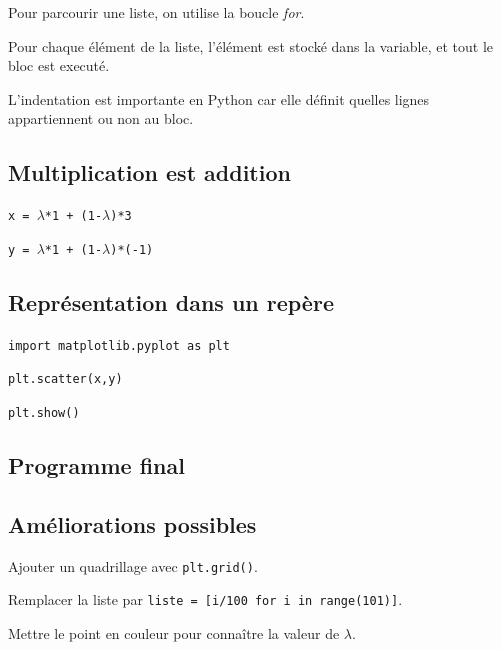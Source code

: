 Pour parcourir une liste, on utilise la boucle \emph{for}.

Pour chaque élément de la liste, l'élément est stocké dans la variable, et tout le bloc est executé.

L'indentation est importante en Python car elle définit quelles lignes appartiennent ou non au bloc.

\subsection*{Multiplication est addition}

\texttt{x = $\lambda$*1 + (1-$\lambda$)*3}

\texttt{y = $\lambda$*1 + (1-$\lambda$)*(-1)}

\subsection*{Représentation dans un repère}

\texttt{import matplotlib.pyplot as plt}

\texttt{plt.scatter(x,y)}

\texttt{plt.show()}

\subsection*{Programme final}

\vspace{10cm}

\subsection*{Améliorations possibles}

Ajouter un quadrillage avec 
\texttt{plt.grid()}.

Remplacer la liste par \texttt{liste = [i/100 for i in range(101)]}.

Mettre le point en couleur pour connaître la valeur de $\lambda$.


\newpage
{}


